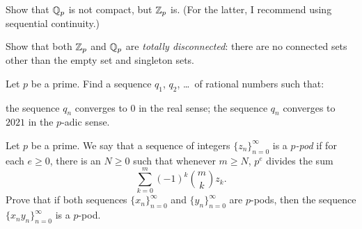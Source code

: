 \section{\problemhead}
\begin{dproblem}
	[$\ZZ_p$ is compact]
	Show that $\mathbb Q_p$ is not compact, but $\ZZ_p$ is.
	(For the latter, I recommend using sequential continuity.)
\end{dproblem}
\begin{dproblem}
	Show that both $\ZZ_p$ and $\mathbb Q_p$ are \emph{totally disconnected}:
	there are no connected sets other than the empty set and singleton sets.
\end{dproblem}

\begin{problem}
	Let $p$ be a prime.
	Find a sequence $q_1$, $q_2$, \dots\ of rational numbers such that:
	\begin{itemize}
	\ii the sequence $q_n$ converges to $0$ in the real sense;
	\ii the sequence $q_n$ converges to $2021$ in the $p$-adic sense.
	\end{itemize}
\end{problem}

\begin{problem}
	Let $p$ be a prime.
	We say that a sequence of integers $\{z_n\}_{n=0}^\infty$
	is a \emph{$p$-pod} if for each $e \geq 0$,
	there is an $N \geq 0$ such that whenever $m \geq N$,
	$p^e$ divides the sum
	\[ \sum_{k=0}^m (-1)^k \binom mk z_k. \]
	Prove that if both sequences $\{x_n\}_{n=0}^\infty$
	and $\{y_n\}_{n=0}^\infty$ are $p$-pods,
	then the sequence $\{x_n y_n\}_{n=0}^\infty$ is a $p$-pod.
\end{problem}
